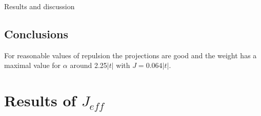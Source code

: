 \documentclass[12pt,twoside]{report}
\begin{document}
\begin{chapter}{Results and discussion}

	\subsection{Conclusions}

	For reasonable values of repulsion the projections are good and the weight
	has a maximal value for $\alpha$ around 2.25$|t|$ with $J=0.064|t|$.
	
	\section{Results of $J_{eff}$}


\end{chapter}
\end{document}
